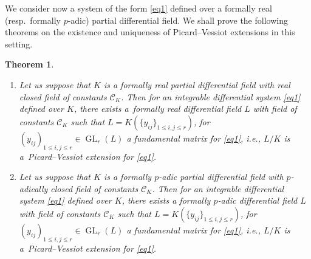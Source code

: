\documentclass[10pt,a4paper]{amsart}
\numberwithin{equation}{section}
\newtheorem{Theorem}{Theorem}[section]
\def \GL{\operatorname{GL}}
\begin{document}
We consider now a system of the form \eqref{eq1} defined over a formally real (resp.\ formally $p$-adic) partial differential field. We shall prove the following theorems on the existence and uniqueness of Picard--Vessiot extensions in this setting.

\begin{Theorem} \quad
\begin{enumerate}\itemsep=0pt
\item[$1.$] Let us suppose that $K$ is a formally real partial differential field with real closed field of constants $\mathcal{C}_K$. Then for an integrable differential system \eqref{eq1} defined over $K$, there exists a~formally real differential field $L$ with field of constants $\mathcal{C}_K$ such that $L=K(\{y_{ij}\}_{1\leq i,j\leq r})$, for~$(y_{ij})_{1\leq i,j\leq r}\in \GL_r(L)$ a fundamental matrix for \eqref{eq1}, i.e., $L/K$ is a~Picard--Vessiot extension for \eqref{eq1}.
\item[$2.$] Let us suppose that $K$ is a formally $p$-adic partial differential field with $p$-adically closed field of constants $\mathcal{C}_K$. Then for an integrable differential system \eqref{eq1} defined over $K$, there exists a formally $p$-adic differential field $L$ with field of constants $\mathcal{C}_K$ such that $L=K(\{y_{ij}\}_{1\leq i,j\leq r})$, for $(y_{ij})_{1\leq i,j\leq r}\in \GL_r(L)$ a fundamental matrix for \eqref{eq1}, i.e., $L/K$ is a~Picard--Vessiot extension for \eqref{eq1}.
\end{enumerate}
\end{Theorem}
\end{document}
